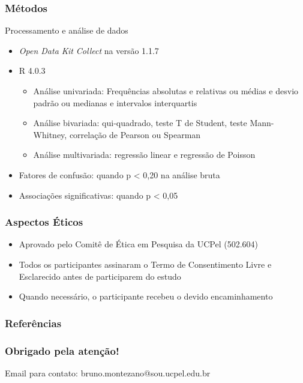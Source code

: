 \documentclass{beamer}
\begin{document}
\begin{frame}
\frametitle{Métodos}

    \begin{block}{Processamento e análise de dados}
        \begin{itemize}
            \item \emph{Open Data Kit Collect} na versão 1.1.7       
            \item R 4.0.3
            \begin{itemize}
                \item Análise univariada: Frequências absolutas e relativas ou
                médias e desvio padrão ou medianas e intervalos interquartis
                \item Análise bivariada: qui-quadrado,
                teste T de Student, teste Mann-Whitney, correlação de Pearson
                ou Spearman
                \item Análise multivariada: regressão linear e regressão de Poisson
            \end{itemize}
            \item Fatores de confusão: quando p < 0,20 na análise bruta
            \item Associações significativas: quando p < 0,05
        \end{itemize}
    \end{block}

\end{frame}

\begin{frame}
\frametitle{Aspectos Éticos}

    \Large
    \begin{itemize}

        \item Aprovado pelo Comitê de Ética em Pesquisa da UCPel (502.604)

        \item Todos os participantes assinaram o Termo de Consentimento Livre
        e Esclarecido antes de participarem do estudo

        \item Quando necessário, o participante recebeu o devido encaminhamento

    \end{itemize}

\end{frame}

\begin{frame}[allowframebreaks]
\frametitle{Referências}

\printbibliography

\end{frame}

\begin{frame}
\frametitle{Obrigado pela atenção!}


    \begin{block}{Email para contato:}
        bruno.montezano@sou.ucpel.edu.br
    \end{block}

\end{frame}
\end{document}
